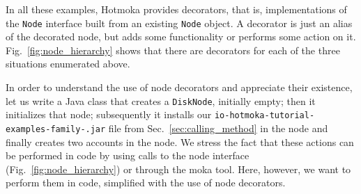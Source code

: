 In all these examples, Hotmoka provides decorators,
that is, implementations of the
\texttt{Node} interface built from an existing \texttt{Node} object. A decorator is just an alias
of the decorated node, but adds some functionality or performs some action on it.
Fig.~\ref{fig:node_hierarchy} shows that there are decorators for each of the three
situations enumerated above.

In order to understand the use of node decorators and appreciate their existence,
let us write a Java class that creates a \texttt{DiskNode}, initially empty;
then it initializes that node; subsequently it installs our \texttt{io-hotmoka-tutorial-examples-family-\hotmokaVersion{}.jar}
file from Sec.~\ref{sec:calling_method} in the node and finally creates two accounts in the node.
We stress the fact that these actions
can be performed in code by using calls to the node interface (Fig.~\ref{fig:node_hierarchy}) or
through the moka tool. Here, however, we want to perform them
in code, simplified with the use of node decorators.


